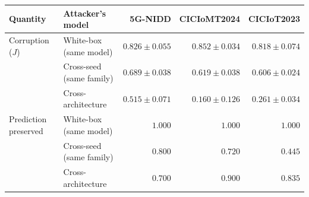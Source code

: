 \begin{tabular}{llrrr}
\toprule
\textbf{Quantity} & \textbf{Attacker's model} & \textbf{5G-NIDD} & \textbf{CICIoMT2024} & \textbf{CICIoT2023} \\
\midrule
Corruption ($J$) & White-box (same model) & $0.826 \pm 0.055$ & $0.852 \pm 0.034$ & $0.818 \pm 0.074$ \\
 & Cross-seed (same family) & $0.689 \pm 0.038$ & $0.619 \pm 0.038$ & $0.606 \pm 0.024$ \\
 & Cross-architecture & $0.515 \pm 0.071$ & $0.160 \pm 0.126$ & $0.261 \pm 0.034$ \\
\addlinespace
Prediction preserved & White-box (same model) & $1.000$ & $1.000$ & $1.000$ \\
 & Cross-seed (same family) & $0.800$ & $0.720$ & $0.445$ \\
 & Cross-architecture & $0.700$ & $0.900$ & $0.835$ \\
\bottomrule
\end{tabular}
